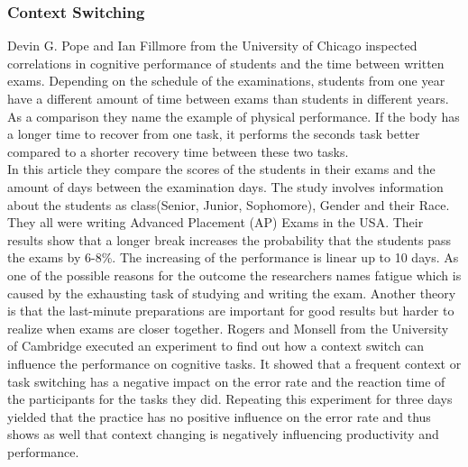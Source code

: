 \subsubsection{Context Switching}
Devin G. Pope and Ian Fillmore from the University of Chicago \cite{pope2015impact} inspected correlations in cognitive performance of students and the time between written exams. 
Depending on the schedule of the examinations, students from one year have a different amount of time between exams than students in different years.
As a comparison they name the example of physical performance. If the body has a longer time to recover from one task, it performs the seconds task better compared to a shorter recovery time between these two tasks.\\ 
In this article they compare the scores of the students in their exams and the amount of days between the examination days. 
The study involves information about the students as class(Senior, Junior, Sophomore), Gender and their Race. They all were writing Advanced Placement (AP) Exams in the USA. 
Their results show that a longer break increases the probability that the students pass the exams by 6-8\%. The increasing of the performance is linear up to 10 days.
\bigbreak
As one of the possible reasons for the outcome the researchers names fatigue which is caused by the exhausting task of studying and writing the exam. Another theory is that the last-minute preparations are important for good results but harder to realize when exams are closer together. 
Rogers and Monsell from the University of Cambridge \cite{rogers1995costs} executed an experiment to find out how a context switch can influence the performance on cognitive tasks. It showed that a frequent context or task switching has a negative impact on the error rate and the reaction time of the participants for the tasks they did. Repeating this experiment for three days yielded that the practice has no positive influence on the error rate and thus shows as well that context changing is negatively influencing productivity and performance. 

